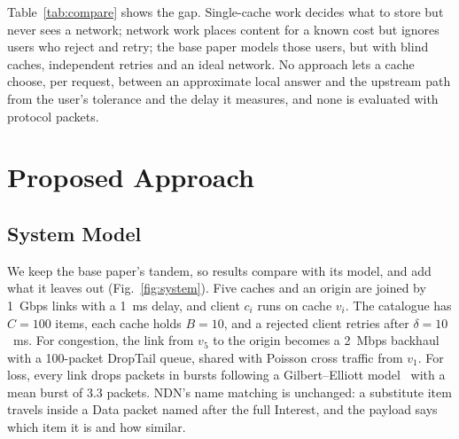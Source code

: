 \documentclass[11pt,a4paper]{article}
\begin{document}
Table~\ref{tab:compare} shows the gap. Single-cache work decides what to store but never sees a
network; network work places content for a known cost but ignores users who reject and retry; the
base paper models those users, but with blind caches, independent retries and an ideal network. No
approach lets a cache choose, per request, between an approximate local answer and the upstream path
from the user's tolerance and the delay it measures, and none is evaluated with protocol packets.

\section{Proposed Approach}\label{sec:approach}

\subsection{System Model}\label{sec:system}
We keep the base paper's tandem, so results compare with its model, and add what it leaves out
(Fig.~\ref{fig:system}). Five caches and an origin are joined by 1~Gbps links with a 1~ms delay,
and client $c_i$ runs on cache $v_i$. The catalogue has $C = 100$ items, each cache holds
$B = 10$, and a rejected client retries after $\delta = 10$~ms. For congestion, the link from $v_5$
to the origin becomes a 2~Mbps backhaul with a 100-packet DropTail queue, shared with Poisson cross
traffic from $v_1$. For loss, every link drops packets in bursts following a Gilbert--Elliott
model~\cite{gilbert1960capacity,elliott1963estimates} with a mean burst of 3.3 packets. NDN's name
matching is unchanged: a substitute item travels inside a Data packet named after the full
Interest, and the payload says which item it is and how similar.
\end{document}
